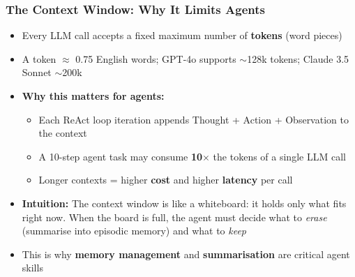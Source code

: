 
\begin{frame}[fragile]\frametitle{The Context Window: Why It Limits Agents}
      \begin{itemize}
        \item Every LLM call accepts a fixed maximum number of \textbf{tokens} (word pieces)
        \item A token $\approx$ 0.75 English words; GPT-4o supports $\sim$128k tokens; Claude 3.5 Sonnet $\sim$200k
        \item \textbf{Why this matters for agents:}
        \begin{itemize}
            \item Each ReAct loop iteration appends Thought + Action + Observation to the context
            \item A 10-step agent task may consume \textbf{10$\times$} the tokens of a single LLM call
            \item Longer contexts = higher \textbf{cost} and higher \textbf{latency} per call
        \end{itemize}
        \item \textbf{Intuition:} The context window is like a whiteboard: it holds only what fits right now. When the board is full, the agent must decide what to \emph{erase} (summarise into episodic memory) and what to \emph{keep}
        \item This is why \textbf{memory management} and \textbf{summarisation} are critical agent skills
      \end{itemize}
\end{frame}

